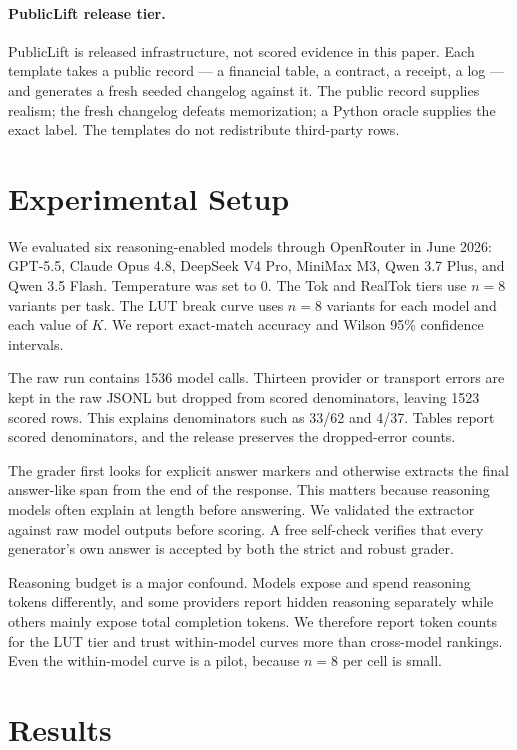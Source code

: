 \documentclass[10pt,twocolumn]{article}
\begin{document}
\paragraph{PublicLift release tier.}
PublicLift is released infrastructure, not scored evidence in this paper. Each template takes a public record --- a financial table, a contract, a receipt, a log --- and generates a fresh seeded changelog against it. The public record supplies realism; the fresh changelog defeats memorization; a Python oracle supplies the exact label. The templates do not redistribute third-party rows.

\section{Experimental Setup}
We evaluated six reasoning-enabled models through OpenRouter in June 2026: GPT-5.5, Claude Opus 4.8, DeepSeek V4 Pro, MiniMax M3, Qwen 3.7 Plus, and Qwen 3.5 Flash. Temperature was set to 0. The Tok and RealTok tiers use $n=8$ variants per task. The LUT break curve uses $n=8$ variants for each model and each value of $K$. We report exact-match accuracy and Wilson 95\% confidence intervals.

The raw run contains 1536 model calls. Thirteen provider or transport errors are kept in the raw JSONL but dropped from scored denominators, leaving 1523 scored rows. This explains denominators such as 33/62 and 4/37. Tables report scored denominators, and the release preserves the dropped-error counts.

The grader first looks for explicit answer markers and otherwise extracts the final answer-like span from the end of the response. This matters because reasoning models often explain at length before answering. We validated the extractor against raw model outputs before scoring. A free self-check verifies that every generator's own answer is accepted by both the strict and robust grader.

Reasoning budget is a major confound. Models expose and spend reasoning tokens differently, and some providers report hidden reasoning separately while others mainly expose total completion tokens. We therefore report token counts for the LUT tier and trust within-model curves more than cross-model rankings. Even the within-model curve is a pilot, because $n=8$ per cell is small.

\section{Results}
\end{document}
